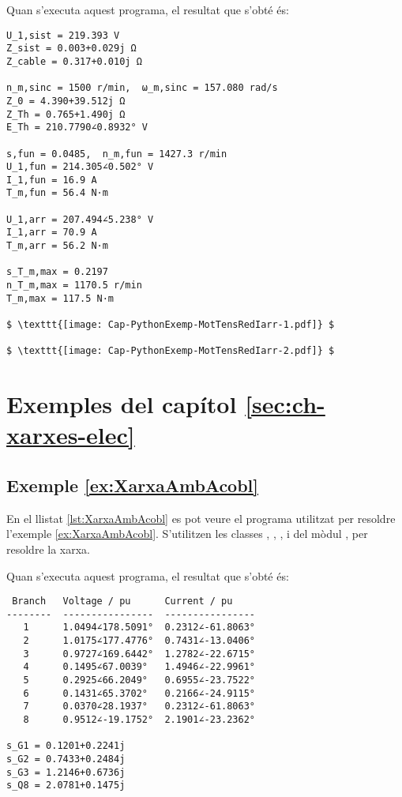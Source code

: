 Quan s'executa aquest programa, el resultat que s'obté és:
\lstset{
	language=,
	numbers=none,
	frame=none
}
\begin{lstlisting}[mathescape=true]
U_1,sist = 219.393 V
Z_sist = 0.003+0.029j Ω
Z_cable = 0.317+0.010j Ω

n_m,sinc = 1500 r/min,  ω_m,sinc = 157.080 rad/s
Z_0 = 4.390+39.512j Ω
Z_Th = 0.765+1.490j Ω
E_Th = 210.7790∠0.8932° V

s,fun = 0.0485,  n_m,fun = 1427.3 r/min
U_1,fun = 214.305∠0.502° V
I_1,fun = 16.9 A
T_m,fun = 56.4 N·m

U_1,arr = 207.494∠5.238° V
I_1,arr = 70.9 A
T_m,arr = 56.2 N·m

s_T_m,max = 0.2197
n_T_m,max = 1170.5 r/min
T_m,max = 117.5 N·m

$ \texttt{[image: Cap-PythonExemp-MotTensRedIarr-1.pdf]} $

$ \texttt{[image: Cap-PythonExemp-MotTensRedIarr-2.pdf]} $
\end{lstlisting} 







\section{Exemples del capítol \ref*{sec:ch-xarxes-elec}}

\hypertarget{exemple:XarxaAmbAcobl}{\subsection{Exemple \ref*{ex:XarxaAmbAcobl} \XarxaAmbAcobl}}
En el llistat \vref{lst:XarxaAmbAcobl} es pot veure el programa utilitzat per resoldre l'exemple \vref{ex:XarxaAmbAcobl}. S'utilitzen les classes , , ,  i  del mòdul ,  per resoldre la xarxa.


Quan s'executa aquest programa, el resultat que s'obté és:
\lstset{
	language=,
	numbers=none,
	frame=none
}
\begin{lstlisting}
 Branch   Voltage / pu      Current / pu
--------  ----------------  ----------------
   1      1.0494∠178.5091°  0.2312∠-61.8063°
   2      1.0175∠177.4776°  0.7431∠-13.0406°
   3      0.9727∠169.6442°  1.2782∠-22.6715°
   4      0.1495∠67.0039°   1.4946∠-22.9961°
   5      0.2925∠66.2049°   0.6955∠-23.7522°
   6      0.1431∠65.3702°   0.2166∠-24.9115°
   7      0.0370∠28.1937°   0.2312∠-61.8063°
   8      0.9512∠-19.1752°  2.1901∠-23.2362°

s_G1 = 0.1201+0.2241j
s_G2 = 0.7433+0.2484j
s_G3 = 1.2146+0.6736j
s_Q8 = 2.0781+0.1475j
\end{lstlisting} 


